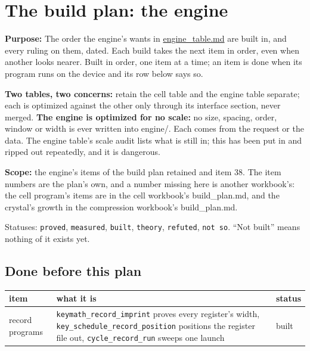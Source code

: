 \chapter{\texorpdfstring{The build plan: the engine}{The build plan: the engine}}
\label{chap:build-plan}

\textbf{Purpose:} The order the engine's wants in \hyperref[chap:engine-table]{engine\_\allowbreak{}table.md} are built in, and every ruling on them, dated. Each build takes the next item in order, even when another looks nearer. Built in order, one item at a time; an item is done when its program runs on the device and its row below says so.

\textbf{Two tables, two concerns:} retain the cell table and the engine table separate; each is optimized against the other only through its interface section, never merged. \textbf{The engine is optimized for no scale:} no size, spacing, order, window or width is ever written into engine/. Each comes from the request or the data. The engine table's scale audit lists what is still in; this has been put in and ripped out repeatedly, and it is dangerous.

\textbf{Scope:} the engine's items of the build plan retained and item 38. The item numbers are the plan's own, and a number missing here is another workbook's: the cell program's items are in the cell workbook's build\_\allowbreak{}plan.md, and the crystal's growth in the compression workbook's build\_\allowbreak{}plan.md.

Statuses: \texttt{proved}, \texttt{measured}, \texttt{built}, \texttt{theory}, \texttt{refuted}, \texttt{not so}. “Not built” means nothing of it exists yet.

\section{\texorpdfstring{Done before this plan}{Done before this plan}}

{\small
\setlength{\tabcolsep}{6pt}
\begin{longtable}{>{\RaggedRight\arraybackslash}p{}>{\RaggedRight\arraybackslash}p{}>{\RaggedRight\arraybackslash}p{}}
\toprule
item & what it is & status \\
\midrule
\endhead
record programs & \texttt{keymath\_\allowbreak{}record\_\allowbreak{}imprint} proves every register's width, \texttt{key\_\allowbreak{}schedule\_\allowbreak{}record\_\allowbreak{}position} positions the register file out, \texttt{cycle\_\allowbreak{}record\_\allowbreak{}run} sweeps one launch & built \\
\bottomrule
\end{longtable}
}

